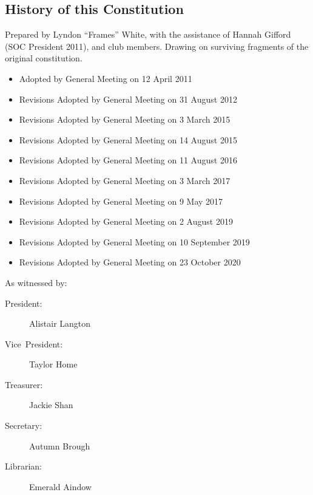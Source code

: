 \documentclass[a4paper]{article}
\begin{document}
\begin{appendices}

    \section{History of this Constitution} \label{sec:app:history}

    \noindent Prepared by Lyndon ``Frames'' White, with the assistance of Hannah Gifford (SOC President 2011), and club members. Drawing on surviving fragments of the original constitution.

    \medskip{}

    \begin{itemize}[label={}]
        \item Adopted by General Meeting on 12 April 2011
        \item Revisions Adopted by General Meeting on 31 August 2012
        \item Revisions Adopted by General Meeting on 3 March 2015
        \item Revisions Adopted by General Meeting on 14 August 2015
        \item Revisions Adopted by General Meeting on 11 August 2016
        \item Revisions Adopted by General Meeting on 3 March 2017
        \item Revisions Adopted by General Meeting on 9 May 2017
        \item Revisions Adopted by General Meeting on 2 August 2019
        \item Revisions Adopted by General Meeting on 10 September 2019
        \item Revisions Adopted by General Meeting on 23 October 2020
    \end{itemize}

    \medskip{}

    \noindent As witnessed by:
    \begin{description}
        \item[{President:}] Alistair Langton
        \item[{Vice~President:}] Taylor Home
        \item[{Treasurer:}] Jackie Shan
        \item[{Secretary:}] Autumn Brough
        \item[{Librarian:}] Emerald Aindow
    \end{description}

\end{appendices}
\end{document}
